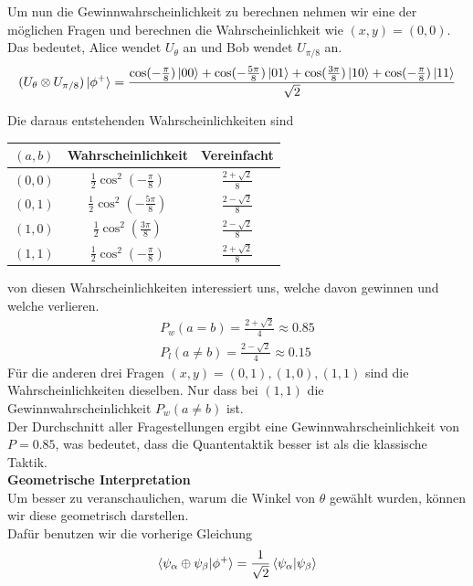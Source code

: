 Um nun die Gewinnwahrscheinlichkeit zu berechnen nehmen wir eine der möglichen Fragen und berechnen die Wahrscheinlichkeit wie $(x, y) = (0, 0)$.\\
Das bedeutet, Alice wendet $U_\theta$ an und Bob wendet $U_{\pi/8}$ an.\\

\begin{equation}
    (U_\theta \otimes U_{\pi/8})\ket{\phi^+} = \frac{\cos(-\frac{\pi}{8})\ket{00} + \cos(-\frac{5\pi}{8})\ket{01} + \cos(\frac{3\pi}{8})\ket{10} + \cos(-\frac{\pi}{8})\ket{11}}{\sqrt{2}}
\end{equation}

Die daraus entstehenden Wahrscheinlichkeiten sind

\begin{center}
    \begin{tabular}{c|c|c}
    $(a, b)$ & Wahrscheinlichkeit & Vereinfacht \\ \hline
    $(0, 0)$ & $\frac{1}{2}\cos^2(-\frac{\pi}{8})$ & $\frac{2+\sqrt{2}}{8}$ \\
    $(0, 1)$ & $\frac{1}{2}\cos^2(-\frac{5\pi}{8})$ & $\frac{2-\sqrt{2}}{8}$ \\
    $(1, 0)$ & $\frac{1}{2}\cos^2(\frac{3\pi}{8})$ & $\frac{2-\sqrt{2}}{8}$ \\
    $(1, 1)$ & $\frac{1}{2}\cos^2(-\frac{\pi}{8})$ & $\frac{2+\sqrt{2}}{8}$
    \end{tabular}
\end{center}

von diesen Wahrscheinlichkeiten interessiert uns, welche davon gewinnen und welche verlieren. 
\begin{align}
    P_w(a = b) = \frac{2+\sqrt{2}}{4} \approx 0.85 \\
    P_l(a \neq b) = \frac{2-\sqrt{2}}{4} \approx 0.15
\end{align}
Für die anderen drei Fragen $(x, y) = (0, 1), (1, 0), (1, 1)$ sind die Wahrscheinlichkeiten dieselben. Nur dass bei $(1, 1)$ die Gewinnwahrscheinlichkeit $P_w(a \neq b)$ ist.\\
Der Durchschnitt aller Fragestellungen ergibt eine Gewinnwahrscheinlichkeit von $P = 0.85$, was bedeutet, dass die Quantentaktik besser ist als die klassische Taktik.\\

\textbf{Geometrische Interpretation}\\
Um besser zu veranschaulichen, warum die Winkel von $\theta$ gewählt wurden, können wir diese geometrisch darstellen.\\
Dafür benutzen wir die vorherige Gleichung
\begin{equation}
    \braket{\psi_\alpha \oplus \psi_\beta | \phi^+} = \frac{1}{\sqrt{2}}\braket{\psi_\alpha | \psi_\beta}
\end{equation}

